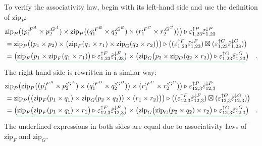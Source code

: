 To verify the associativity law, begin with its left-hand side and
use the definition of $\text{zip}_{P}$:
\begin{align*}
 & \text{zip}_{P}\big((p_{1}^{:F^{A}}\times p_{2}^{:G^{A}})\times\text{zip}_{P}\big((q_{1}^{:F^{B}}\times q_{2}^{:G^{B}})\times(r_{1}^{:F^{C}}\times r_{2}^{:G^{C}})\big)\big)\triangleright\varepsilon_{1,23}^{\uparrow P}\tilde{\varepsilon}_{1,23}^{\downarrow P}\\
 & =\text{zip}_{P}\big((p_{1}\times p_{2})\times\big(\text{zip}_{F}(q_{1}\times r_{1})\times\text{zip}_{G}(q_{2}\times r_{2})\big)\big)\triangleright\big((\varepsilon_{1,23}^{\uparrow F}\tilde{\varepsilon}_{1,23}^{\downarrow F})\boxtimes(\varepsilon_{1,23}^{\uparrow G}\tilde{\varepsilon}_{1,23}^{\downarrow G})\big)\\
 & =\big(\gunderline{\text{zip}_{F}\big(p_{1}\times\text{zip}_{F}(q_{1}\times r_{1})\big)\triangleright\varepsilon_{1,23}^{\uparrow F}\tilde{\varepsilon}_{1,23}^{\downarrow F}}\big)\times\big(\gunderline{\text{zip}_{G}\big(p_{2}\times\text{zip}_{G}(q_{2}\times r_{2})\big)\triangleright\varepsilon_{1,23}^{\uparrow G}\tilde{\varepsilon}_{1,23}^{\downarrow G}}\big)\quad.
\end{align*}
The right-hand side is rewritten in a similar way:
\begin{align*}
 & \text{zip}_{P}\big(\text{zip}_{P}\big((p_{1}^{:F^{A}}\times p_{2}^{:G^{A}})\times(q_{1}^{:F^{B}}\times q_{2}^{:G^{B}})\big)\times(r_{1}^{:F^{C}}\times r_{2}^{:G^{C}})\big)\triangleright\varepsilon_{12,3}^{\uparrow P}\tilde{\varepsilon}_{12,3}^{\downarrow P}\\
 & =\text{zip}_{P}\big(\big(\text{zip}_{F}(p_{1}\times q_{1})\times\text{zip}_{G}(p_{2}\times q_{2})\big)\times(r_{1}\times r_{2})\big)\big)\triangleright\big((\varepsilon_{12,3}^{\uparrow F}\tilde{\varepsilon}_{12,3}^{\downarrow F})\boxtimes(\varepsilon_{12,3}^{\uparrow G}\tilde{\varepsilon}_{12,3}^{\downarrow G})\big)\\
 & =\big(\gunderline{\text{zip}_{F}\big(\text{zip}_{F}(p_{1}\times q_{1})\times r_{1}\big)\triangleright\varepsilon_{12,3}^{\uparrow F}\tilde{\varepsilon}_{12,3}^{\downarrow F}}\big)\times\big(\gunderline{\text{zip}_{G}\big(\text{zip}_{G}(p_{2}\times q_{2})\times r_{2}\big)\triangleright\varepsilon_{12,3}^{\uparrow G}\tilde{\varepsilon}_{12,3}^{\downarrow G}}\big)\quad.
\end{align*}
The underlined expressions in both sides are equal due to associativity
laws of $\text{zip}_{F}$ and $\text{zip}_{G}$.

